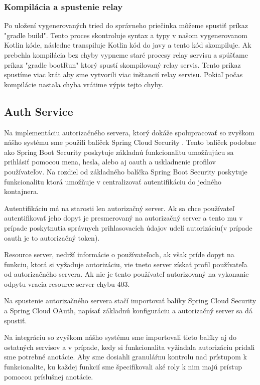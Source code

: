 \subsubsection{Kompilácia a spustenie relay} 

Po uložení vygenerovaných tried do správneho priečinka môžeme spustiť príkaz "gradle build". Tento proces skontroluje syntax a typy v našom vygenerovanom Kotlin kóde, následne transpiluje Kotlin kód do javy a tento kód skompiluje. Ak prebehla kompilácia bez chyby vypneme staré procesy relay servisu a spúšťame príkaz "gradle bootRun" ktorý spustí skompilovaný relay servis. Tento príkaz spustíme viac krát aby sme vytvorili viac inštancií relay servisu. Pokiaľ počas kompilácie nastala chyba vrátime výpis tejto chyby.  


\subsection{Auth Service} 

Na implementáciu autorizačného servera, ktorý dokáže spolupracovať so zvyškom nášho systému sme použili balíček Spring Cloud Security \cite{cloud_security}. Tento balíček podobne ako Spring Boot Security poskytuje základnú funkcionalitu umožňujúcu sa prihlásiť pomocou mena, hesla, alebo aj \acrshort{oauth} a uskladnenie profilov používateľov. 
Na rozdiel od základného balíčka Spring Boot Security poskytuje funkcionalitu ktorá umožňuje v centralizovať autentifikáciu do jedného kontajnera. 

Autentifikáciu má na starosti len autorizačný server. Ak sa chce používateľ autentifikovať jeho dopyt je presmerovaný na autorizačný server a tento mu v prípade poskytnutia správnych prihlasovacích údajov udelí autorizáciu(v prípade \acrshort{oauth} je to autorizačný token).  

Resource server, nedrží informácie o používateľoch, ak však príde dopyt na funkciu, ktorá si vyžaduje autorizáciu, vie tneto server získať profil používateľa od autorizačného servera. Ak nie je tento používateľ autorizovaný na vykonanie odpytu vracia resource server chybu 403.

Na spustenie autorizačného servera stačí importovať balíky  Spring Cloud Security a Spring Cloud OAuth, napísať základnú konfiguráciu a autorizačný server sa dá spustiť.  

Na integráciu so zvyškom nášho systému sme importovali tieto balíky aj do ostatných servisov a v prípade, kedy si funkcionalita vyžiadala autorizáciu  pridali sme potrebné anotácie. Aby sme dosiahli granuláŕnu kontrolu nad prístupom k funkcionalite, ku každej funkcií sme špecifikovali aké roly k nim majú prístup pomocou príslušnej anotácie. 

